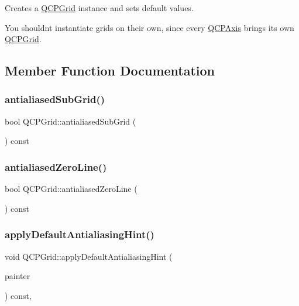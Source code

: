 Creates a \mbox{\hyperlink{class_q_c_p_grid}{Q\+C\+P\+Grid}} instance and sets default values.

You shouldn\textquotesingle{}t instantiate grids on their own, since every \mbox{\hyperlink{class_q_c_p_axis}{Q\+C\+P\+Axis}} brings its own \mbox{\hyperlink{class_q_c_p_grid}{Q\+C\+P\+Grid}}. 

\subsection{Member Function Documentation}
\mbox{\label{class_q_c_p_grid_af16a269b15b2a8d904be087d060536bc}} 
\subsubsection{\texorpdfstring{antialiasedSubGrid()}{antialiasedSubGrid()}}
{\footnotesize\ttfamily bool Q\+C\+P\+Grid\+::antialiased\+Sub\+Grid (\begin{DoxyParamCaption}{ }\end{DoxyParamCaption}) const\hspace{0.3cm}{\ttfamily [inline]}}

\mbox{\label{class_q_c_p_grid_a578d0bd4d2e5000a2ca69b9a034d59aa}} 
\subsubsection{\texorpdfstring{antialiasedZeroLine()}{antialiasedZeroLine()}}
{\footnotesize\ttfamily bool Q\+C\+P\+Grid\+::antialiased\+Zero\+Line (\begin{DoxyParamCaption}{ }\end{DoxyParamCaption}) const\hspace{0.3cm}{\ttfamily [inline]}}

\mbox{\label{class_q_c_p_grid_a64fa48e16b4629f5df2a5029ab6e761c}} 
\subsubsection{\texorpdfstring{applyDefaultAntialiasingHint()}{applyDefaultAntialiasingHint()}}
{\footnotesize\ttfamily void Q\+C\+P\+Grid\+::apply\+Default\+Antialiasing\+Hint (\begin{DoxyParamCaption}\item[{\mbox{\hyperlink{class_q_c_p_painter}{Q\+C\+P\+Painter}} $\ast$}]{painter }\end{DoxyParamCaption}) const\hspace{0.3cm}{\ttfamily [protected]}, {\ttfamily [virtual]}}



